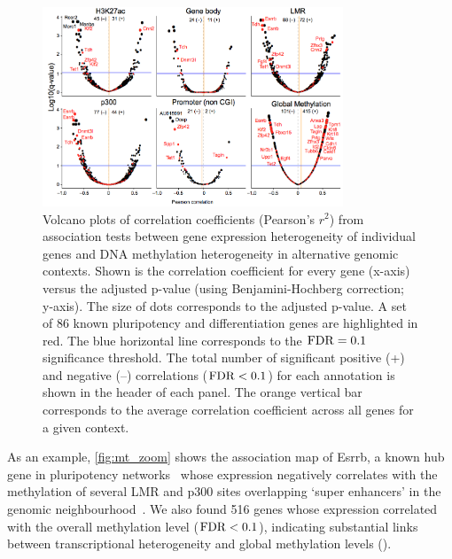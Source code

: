 \begin{figure}[htbp!]
\centering
\includegraphics[width=0.8\textwidth]{gene_volcano}
\caption[Volcano plots of correlation coefficients.]{Volcano plots of correlation coefficients (Pearson's $r^2$) from association tests between gene expression heterogeneity of individual genes and DNA methylation heterogeneity in alternative genomic contexts. Shown is the correlation coefficient for every gene (x-axis) versus the adjusted p-value (using Benjamini-Hochberg correction; y-axis). The size of dots corresponds to the adjusted p-value. A set of 86 known pluripotency and differentiation genes are highlighted in red. The blue horizontal line corresponds to the $\operatorname{FDR}=0.1$ significance threshold. The total number of significant positive (+) and negative (–) correlations ($\operatorname{FDR}<0.1$) for each annotation is shown in the header of each panel. The orange vertical bar corresponds to the average correlation coefficient across all genes for a given context.}
\label{fig:mt_gene_volcano}
\end{figure}

As an example, \cref{fig:mt_zoom} shows the association map of Esrrb, a known hub gene in pluripotency networks~\citep{papp_pluripotency_2012} whose expression negatively correlates with the methylation of several LMR and p300 sites overlapping `super enhancers' in the genomic neighbourhood~\citep{whyte_master_2013}. We also found 516 genes whose expression correlated with the overall methylation level ($\operatorname{FDR}<0.1$), indicating substantial links between transcriptional heterogeneity and global methylation levels ().

